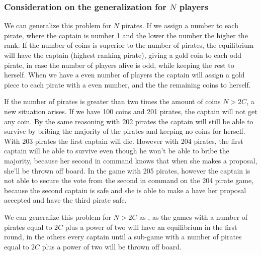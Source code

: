 \subsubsection{Consideration on the generalization for $N$ players}
\label{subsubsec:analysis_PG}

We can generalize this problem for $N$ pirates. If we assign a number to each pirate, where the captain is number 1 and the lower the number the higher the rank. If the number of coins is superior to the number of pirates, the equilibrium will have the captain (highest ranking pirate), giving a gold coin to each odd pirate, in case the number of players alive is odd, while keeping the rest to herself. When we have a even number of players the captain will assign a gold piece to each pirate with a even number, and the the remaining coins to herself. 

If the number of pirates is greater than two times the amount of coins $N>2C$, a new situation arises. If we have 100 coins and 201 pirates, the captain will not get any coin. By the same reasoning with 202 pirates the captain will still be able to survive by bribing the majority of the pirates and keeping no coins for herself. With 203 pirates the first captain will die. However with 204 pirates, the first captain will be able to survive even though he won't be able to bribe the majority, because her second in command knows that when she makes a proposal, she'll be thrown off board. In the game with 205 pirates, however the captain is not able to secure the vote from the second in command on the 204 pirate game, because the second captain is safe and she is able to make a have her proposal accepted and have the third pirate safe. 

We can generalize this problem for $N>2C$ as \cite{Stewart1999}, as the games with a number of pirates equal to $2C$ plus a power of two will have an equilibrium in the first round, in the others every captain until a sub-game with a number of pirates equal to $2C$ plus a power of two will be thrown off board.

